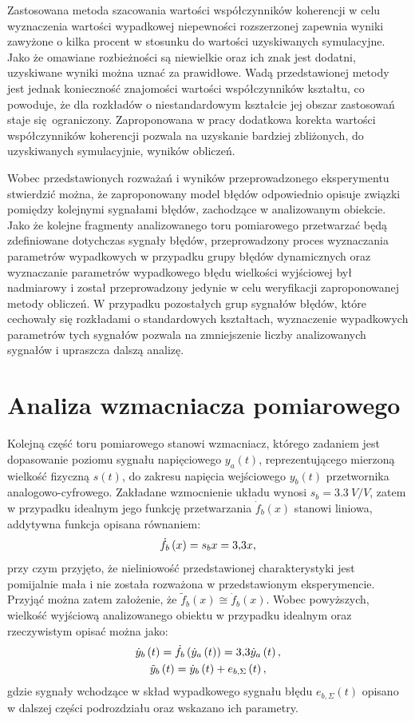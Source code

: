 Zastosowana metoda szacowania wartości współczynników koherencji w celu wyznaczenia wartości wypadkowej niepewności rozszerzonej zapewnia wyniki zawyżone o kilka procent w stosunku do wartości uzyskiwanych symulacyjne. Jako że omawiane rozbieżności są niewielkie oraz ich znak jest dodatni, uzyskiwane wyniki można uznać za prawidłowe. Wadą przedstawionej metody jest jednak konieczność znajomości wartości współczynników kształtu, co powoduje, że dla rozkładów o niestandardowym kształcie jej obszar zastosowań staje się ograniczony. Zaproponowana w pracy dodatkowa korekta wartości współczynników koherencji pozwala na uzyskanie bardziej zbliżonych, do uzyskiwanych symulacyjnie, wyników obliczeń.

Wobec przedstawionych rozważań i wyników przeprowadzonego eksperymentu stwierdzić można, że zaproponowany model błędów odpowiednio opisuje związki pomiędzy kolejnymi sygnałami błędów, zachodzące w analizowanym obiekcie. Jako że kolejne fragmenty analizowanego toru pomiarowego przetwarzać będą zdefiniowane dotychczas sygnały błędów, przeprowadzony proces wyznaczania parametrów wypadkowych w przypadku grupy błędów dynamicznych oraz wyznaczanie parametrów wypadkowego błędu wielkości wyjściowej był nadmiarowy i został przeprowadzony jedynie w celu weryfikacji zaproponowanej metody obliczeń. W przypadku pozostałych grup sygnałów błędów, które cechowały się rozkładami o standardowych kształtach, wyznaczenie wypadkowych parametrów tych sygnałów pozwala na zmniejszenie liczby analizowanych sygnałów i upraszcza dalszą analizę.

\section{Analiza wzmacniacza pomiarowego}

Kolejną część toru pomiarowego stanowi wzmacniacz, którego zadaniem jest dopasowanie poziomu sygnału napięciowego $y_{a}(t)$, reprezentującego mierzoną wielkość fizyczną $s(t)$, do zakresu napięcia wejściowego $y_{b}(t)$ przetwornika analogowo-cyfrowego. Zakładane wzmocnienie układu wynosi $s_{b} = \qty{3.3}{V \per V}$, zatem w przypadku idealnym jego funkcję przetwarzania $\dot{f}_{b}(x)$ stanowi liniowa, addytywna funkcja opisana równaniem:
\begin{equation}
\dot{f}_{b} \left(x\right) = s_{b} x = \num{3.3} x \label{eq:sym_partb_function},
\end{equation}
przy czym przyjęto, że nieliniowość przedstawionej charakterystyki jest pomijalnie mała i nie została rozważona w przedstawionym eksperymencie. Przyjąć można zatem założenie, że $\tilde{f}_{b}(x) \cong \dot{f}_{b}(x)$. Wobec powyższych, wielkość wyjściową analizowanego obiektu w przypadku idealnym oraz rzeczywistym opisać można jako:
\begin{gather}
\dot{y}_{b} \left(t\right) = \dot{f}_{b} \left(\dot{y}_{a} \left(t\right)\right) = \num{3.3} \dot{y}_{a} \left(t\right) \label{eq:sym_partb_out_ideal}, \\
\tilde{y}_{b} \left(t\right) = \dot{y}_{b} \left(t\right) + e_{b,\Sigma} \left(t\right) \label{eq:sym_partb_out_real},
\end{gather}
gdzie sygnały wchodzące w skład wypadkowego sygnału błędu $e_{b,\Sigma}(t)$ opisano w dalszej części podrozdziału oraz wskazano ich parametry.

